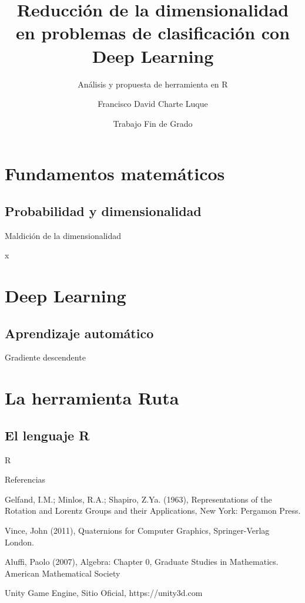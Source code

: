 \documentclass[,ignorenonframetext,compress]{beamer}
\title{Reducción de la dimensionalidad en problemas de clasificación con Deep
Learning}
\subtitle{Análisis y propuesta de herramienta en R}
\author{Francisco David Charte Luque}
\institute{Universidad de Granada}
\date{Trabajo Fin de Grado}
\begin{document}
\frame{\titlepage}

\section{Fundamentos matemáticos}\label{fundamentos-matemuxe1ticos}

\subsection{Probabilidad y
dimensionalidad}\label{probabilidad-y-dimensionalidad}

\begin{frame}{Maldición de la dimensionalidad}

x

\end{frame}

\section{Deep Learning}\label{deep-learning}

\subsection{Aprendizaje automático}\label{aprendizaje-automuxe1tico}

\begin{frame}{Gradiente descendente}

\end{frame}

\section{La herramienta Ruta}\label{la-herramienta-ruta}

\subsection{El lenguaje R}\label{el-lenguaje-r}

\begin{frame}{R}

\end{frame}

\begin{frame}{Referencias}

\begin{thebibliography}{9}

  Gelfand, I.M.; Minlos, R.A.; Shapiro, Z.Ya. (1963),
  Representations of the Rotation and Lorentz Groups and their Applications,
  New York: Pergamon Press.

  Vince, John (2011),
  Quaternions for Computer Graphics,
  Springer-Verlag London.

  Aluffi, Paolo (2007),
  Algebra: Chapter 0,
  Graduate Studies in Mathematics. American Mathematical Society

  Unity Game Engine,
  Sitio Oficial,
  https://unity3d.com

\end{thebibliography}

\end{frame}
\end{document}
